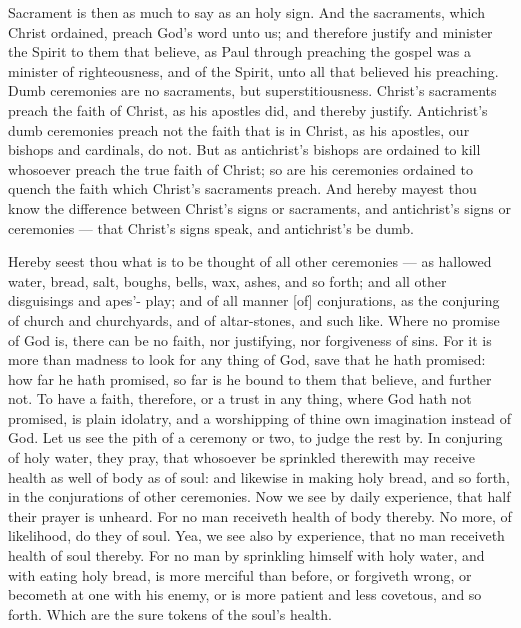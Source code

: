 Sacrament is then as much to say as an holy sign. 
And the sacraments, which Christ ordained, preach God's 
word unto us; and therefore justify and minister the 
Spirit to them that believe, as Paul through preaching the 
gospel was a minister of righteousness, and of the Spirit, 
unto all that believed his preaching. Dumb ceremonies 
are no sacraments, but superstitiousness. Christ's sacraments
preach the faith of Christ, as his apostles did, and 
thereby justify. Antichrist's dumb ceremonies preach not 
the faith that is in Christ, as his apostles, our bishops and 
cardinals, do not. But as antichrist's bishops are ordained 
to kill whosoever preach the true faith of Christ; so are 
his ceremonies ordained to quench the faith which Christ's 
sacraments preach. And hereby mayest thou know the
difference between Christ's signs or sacraments, and antichrist's
signs or ceremonies — that Christ's signs speak, and
antichrist's be dumb.

Hereby seest thou what is to be thought of all other 
ceremonies — as hallowed water, bread, salt, boughs, bells, 
wax, ashes, and so forth; and all other disguisings and apes'- 
play; and of all manner [of] conjurations, as the conjuring 
of church and churchyards, and of altar-stones, and such like. 
Where no promise of God is, there can be no faith, nor justifying,
nor forgiveness of sins. For it is more than madness
to look for any thing of God, save that he hath promised:
how far he hath promised, so far is he bound to them 
that believe, and further not. To have a faith, therefore,
or a trust in any thing, where God hath not promised, is
plain idolatry, and a worshipping of thine own imagination
instead of God. Let us see the pith of a ceremony
or two, to judge the rest by. In conjuring of holy 
water, they pray, that whosoever be sprinkled therewith 
may receive health as well of body as of soul: and likewise
in making holy bread, and so forth, in the conjurations
of other ceremonies. Now we see by daily experience,
that half their prayer is unheard. For no man 
receiveth health of body thereby. No more, of likelihood, 
do they of soul. Yea, we see also by experience, that 
no man receiveth health of soul thereby. For no man by 
sprinkling himself with holy water, and with eating holy bread, 
is more merciful than before, or forgiveth wrong, or becometh
at one with his enemy, or is more patient and less 
covetous, and so forth. Which are the sure tokens of the 
soul's health. 

